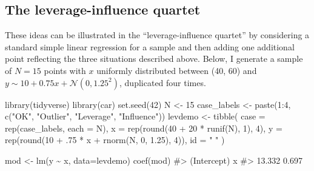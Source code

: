 \documentclass[
  letterpaper,
  10pt,
  krantz2]{krantz}
\makeatletter
\newenvironment{Shaded}{\begin{snugshade}}{\end{snugshade}}
\newcommand{\AttributeTok}[1]{\textcolor[rgb]{0.40,0.45,0.13}{#1}}
\newcommand{\CommentTok}[1]{\textcolor[rgb]{0.37,0.37,0.37}{#1}}
\newcommand{\DecValTok}[1]{\textcolor[rgb]{0.68,0.00,0.00}{#1}}
\newcommand{\FloatTok}[1]{\textcolor[rgb]{0.68,0.00,0.00}{#1}}
\newcommand{\FunctionTok}[1]{\textcolor[rgb]{0.28,0.35,0.67}{#1}}
\newcommand{\NormalTok}[1]{\textcolor[rgb]{0.00,0.23,0.31}{#1}}
\newcommand{\OtherTok}[1]{\textcolor[rgb]{0.00,0.23,0.31}{#1}}
\newcommand{\SpecialCharTok}[1]{\textcolor[rgb]{0.37,0.37,0.37}{#1}}
\newcommand{\StringTok}[1]{\textcolor[rgb]{0.13,0.47,0.30}{#1}}
\newenvironment{kframe}{%
  \medskip{}
  \setlength{\fboxsep}{.8em}
  \def\at@end@of@kframe{}%
  \ifinner\ifhmode%
  \def\at@end@of@kframe{\end{minipage}}%
  \begin{minipage}{\columnwidth}%
  \fi\fi%
  \def\FrameCommand##1{\hskip\@totalleftmargin \hskip-\fboxsep
  \colorbox{shadecolor}{##1}\hskip-\fboxsep
      \hskip-\linewidth \hskip-\@totalleftmargin \hskip\columnwidth}%
  \MakeFramed {\advance\hsize-\width
    \@totalleftmargin\z@ \linewidth\hsize
    \@setminipage}}%
{\par\unskip\endMakeFramed%
  \at@end@of@kframe}
\renewenvironment{Shaded}{\begin{kframe}}{\end{kframe}}
\makeatother
\begin{document}
\hypertarget{the-leverage-influence-quartet}{%
\subsection{The leverage-influence
quartet}\label{the-leverage-influence-quartet}}

These ideas can be illustrated in the ``leverage-influence quartet'' by
considering a standard simple linear regression for a sample and then
adding one additional point reflecting the three situations described
above. Below, I generate a sample of \(N = 15\) points with \(x\)
uniformly distributed between (40, 60) and
\(y \sim 10 + 0.75 x + \mathcal{N}(0, 1.25^2)\), duplicated four times.

\begin{Shaded}
\begin{Highlighting}[]
\FunctionTok{library}\NormalTok{(tidyverse)}
\FunctionTok{library}\NormalTok{(car)}
\FunctionTok{set.seed}\NormalTok{(}\DecValTok{42}\NormalTok{)}
\NormalTok{N }\OtherTok{\textless{}{-}} \DecValTok{15}
\NormalTok{case\_labels }\OtherTok{\textless{}{-}} \FunctionTok{paste}\NormalTok{(}\DecValTok{1}\SpecialCharTok{:}\DecValTok{4}\NormalTok{, }\FunctionTok{c}\NormalTok{(}\StringTok{"OK"}\NormalTok{, }\StringTok{"Outlier"}\NormalTok{, }\StringTok{"Leverage"}\NormalTok{, }\StringTok{"Influence"}\NormalTok{))}
\NormalTok{levdemo }\OtherTok{\textless{}{-}} \FunctionTok{tibble}\NormalTok{(}
    \AttributeTok{case =} \FunctionTok{rep}\NormalTok{(case\_labels, }
               \AttributeTok{each =}\NormalTok{ N),}
    \AttributeTok{x =} \FunctionTok{rep}\NormalTok{(}\FunctionTok{round}\NormalTok{(}\DecValTok{40} \SpecialCharTok{+} \DecValTok{20} \SpecialCharTok{*} \FunctionTok{runif}\NormalTok{(N), }\DecValTok{1}\NormalTok{), }\DecValTok{4}\NormalTok{),}
    \AttributeTok{y =} \FunctionTok{rep}\NormalTok{(}\FunctionTok{round}\NormalTok{(}\DecValTok{10} \SpecialCharTok{+}\NormalTok{ .}\DecValTok{75} \SpecialCharTok{*}\NormalTok{ x }\SpecialCharTok{+} \FunctionTok{rnorm}\NormalTok{(N, }\DecValTok{0}\NormalTok{, }\FloatTok{1.25}\NormalTok{), }\DecValTok{4}\NormalTok{)),}
    \AttributeTok{id =} \StringTok{" "}
\NormalTok{)}

\NormalTok{mod }\OtherTok{\textless{}{-}} \FunctionTok{lm}\NormalTok{(y }\SpecialCharTok{\textasciitilde{}}\NormalTok{ x, }\AttributeTok{data=}\NormalTok{levdemo)}
\FunctionTok{coef}\NormalTok{(mod)}
\CommentTok{\#\textgreater{} (Intercept)           x }
\CommentTok{\#\textgreater{}      13.332       0.697}
\end{Highlighting}
\end{Shaded}
\end{document}
